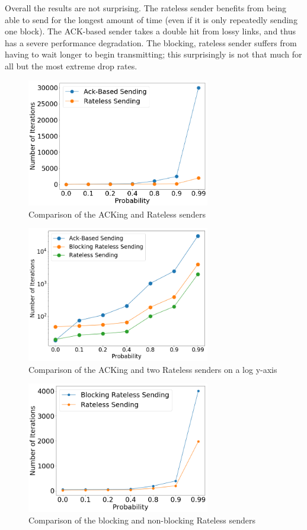Overall the results are not surprising. The rateless sender benefits from being able to send for the longest amount of time (even if it is only repeatedly sending one block). The ACK-based sender takes a double hit from lossy links, and thus has a severe performance degradation. The blocking, rateless sender suffers from having to wait longer to begin transmitting; this surprisingly is not that much for all but the most extreme drop rates.

\begin{figure}[tp]
\centering
\noindent
\includegraphics[width=8cm]{figures/ACK_RATELESS_FINAL.png}
\caption{Comparison of the ACKing and Rateless senders}
\label{graph:ackvsrateless}
\end{figure}

\begin{figure}[tp]
\centering
\noindent
\includegraphics[width=8cm]{figures/TRIPLE_FINAL.png}
\caption{Comparison of the ACKing and two Rateless senders on a log y-axis}
\label{graph:ackvsratelessLOG}
\end{figure}

\begin{figure}[tp]
\centering
\noindent
\includegraphics[width=8cm]{figures/BLOCKING_RATELESS.png}
\caption{Comparison of the blocking and non-blocking Rateless senders}
\label{graph:blockingvsnot}
\end{figure}

